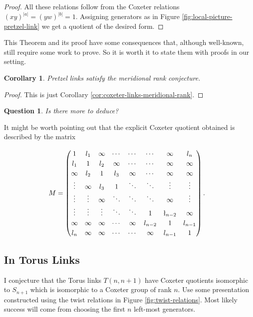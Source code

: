 \documentclass[a4paper]{article}
\newtheorem{corollary}[theorem]{Corollary}
\newtheorem{question}[theorem]{Question}
\theoremstyle{definition}
\begin{document}
\begin{proof}
All these relations follow from the Coxeter relations $(xy)^{|a|} = (yw)^{|b|} = 1$. Assigning generators as in Figure \ref{fig:local-picture-pretzel-link} we get a quotient of the desired form.
\end{proof}

This Theorem and its proof have some consequences that, although well-known, still require some work to prove. So it is worth it to state them with proofs in our setting.

\begin{corollary}
Pretzel links satisfy the meridional rank conjecture.
\end{corollary}

\begin{proof}
This is just Corollary \ref{cor:coxeter-links-meridional-rank}.
\end{proof}

\begin{question}
Is there more to deduce?
\end{question}

It might be worth pointing out that the explicit Coxeter quotient obtained is described by the matrix

$$
\renewcommand\arraystretch{1.2}
M = \left( \begin{matrix}
1 & l_1 & \infty & \cdots & \cdots &\cdots & \infty & l_n \\
l_1 & 1 & l_2 & \infty & \cdots & \cdots & \infty & \infty \\
\infty & l_2 & 1 & l_3 & \infty &\cdots & \infty & \infty \\
\vdots & \infty  & l_3 & 1 & \ddots & \ddots & \vdots & \vdots \\
\vdots & \vdots & \infty & \ddots & \ddots & \ddots & \infty & \vdots \\
\vdots & \vdots & \vdots & \ddots &\ddots & 1 & \l_{n-2} & \infty \\
\infty & \infty & \infty & \cdots & \infty & l_{n-2} & 1 & l_{n-1} \\
l_n & \infty & \infty & \cdots & \cdots & \infty  & l_{n-1} & 1
\end{matrix} \right).$$

\subsection{In Torus Links}
I conjecture that the Torus links $T(n, n+1)$ have Coxeter quotients isomorphic to $S_{n+1}$ which is isomorphic to a Coxeter group of rank $n$. Use some presentation constructed using the twist relations in Figure \ref{fig:twist-relations}. Most likely success will come from choosing the first $n$ left-most generators.
\end{document}
